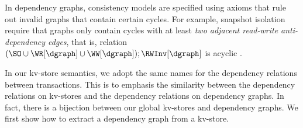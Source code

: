 

In dependency graphs, consistency models are specified using
axioms that rule out invalid graphs that contain certain cycles.
For example, snapshot isolation require that graphs only contain cycles with 
at least \emph{two adjacent read-write anti-dependency edges}, that is,
relation \( (\SO \cup \WR[\dgraph] \cup \WW[\dgraph]) ; \RWInv[\dgraph] \) is acyclic \cite{adya,SIanalysis}.

In our kv-store semantics, 
we adopt the same names for the dependency relations between transactions.
This is to emphasis the similarity between the dependency relations on kv-stores 
and the dependency relations on dependency graphs.
In fact, there is a bijection between our global kv-stores and dependency graphs.
We first show how to extract a dependency graph from a kv-store.
